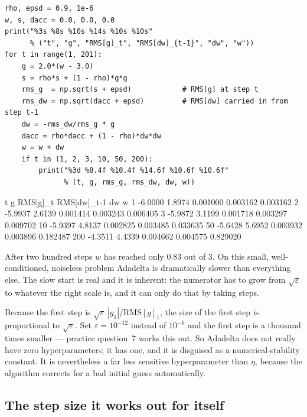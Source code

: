 \documentclass[11pt]{article}
\begin{document}
\begin{lstlisting}
rho, epsd = 0.9, 1e-6
w, s, dacc = 0.0, 0.0, 0.0
print("%3s %8s %10s %14s %10s %10s"
      % ("t", "g", "RMS[g]_t", "RMS[dw]_{t-1}", "dw", "w"))
for t in range(1, 201):
    g = 2.0*(w - 3.0)
    s = rho*s + (1 - rho)*g*g
    rms_g  = np.sqrt(s + epsd)            # RMS[g] at step t
    rms_dw = np.sqrt(dacc + epsd)         # RMS[dw] carried in from step t-1
    dw = -rms_dw/rms_g * g
    dacc = rho*dacc + (1 - rho)*dw*dw
    w = w + dw
    if t in (1, 2, 3, 10, 50, 200):
        print("%3d %8.4f %10.4f %14.6f %10.6f %10.6f"
              % (t, g, rms_g, rms_dw, dw, w))
\end{lstlisting}
\begin{codeout}
  t        g   RMS[g]_t  RMS[dw]_{t-1}         dw          w
  1  -6.0000     1.8974       0.001000   0.003162   0.003162
  2  -5.9937     2.6139       0.001414   0.003243   0.006405
  3  -5.9872     3.1199       0.001718   0.003297   0.009702
 10  -5.9397     4.8137       0.002825   0.003485   0.033635
 50  -5.6428     5.6952       0.003932   0.003896   0.182487
200  -4.3511     4.4339       0.004662   0.004575   0.829020
\end{codeout}

After two hundred steps $w$ has reached only $0.83$ out of $3$. On this small,
well-conditioned, noiseless problem Adadelta is dramatically slower than
everything else. The slow start is real and it is inherent: the numerator has
to grow from $\sqrt{\varepsilon}$ to whatever the right scale is, and it can
only do that by taking steps.

\begin{caution}
Because the first step is $\sqrt{\varepsilon}\,|g_1|/\mathrm{RMS}[g]_1$, the
size of the first step is proportional to $\sqrt{\varepsilon}$. Set
$\varepsilon = 10^{-12}$ instead of $10^{-6}$ and the first step is a thousand
times smaller --- practice question~7 works this out. So Adadelta does not
really have zero hyperparameters; it has one, and it is disguised as a
numerical-stability constant. It is nevertheless a far less sensitive
hyperparameter than $\eta$, because the algorithm corrects for a bad initial
guess automatically.
\end{caution}

\subsection{The step size it works out for itself}
\end{document}
